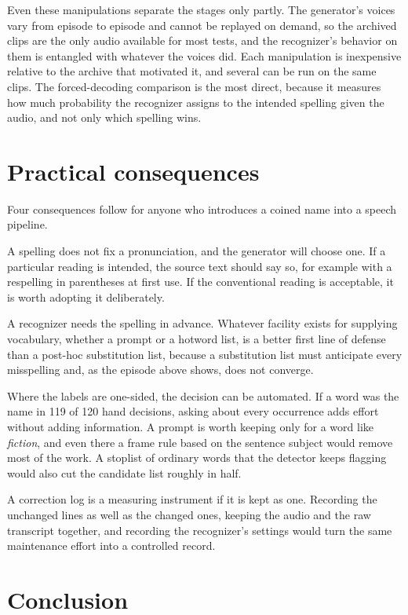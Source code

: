 \documentclass[11pt]{article}
\begin{document}
Even these manipulations separate the stages only partly. The generator's voices vary from episode to episode and cannot be replayed on demand, so the archived clips are the only audio available for most tests, and the recognizer's behavior on them is entangled with whatever the voices did. Each manipulation is inexpensive relative to the archive that motivated it, and several can be run on the same clips. The forced-decoding comparison is the most direct, because it measures how much probability the recognizer assigns to the intended spelling given the audio, and not only which spelling wins.

\section{Practical consequences}

Four consequences follow for anyone who introduces a coined name into a speech pipeline.

A spelling does not fix a pronunciation, and the generator will choose one. If a particular reading is intended, the source text should say so, for example with a respelling in parentheses at first use. If the conventional reading is acceptable, it is worth adopting it deliberately.

A recognizer needs the spelling in advance. Whatever facility exists for supplying vocabulary, whether a prompt or a hotword list, is a better first line of defense than a post-hoc substitution list, because a substitution list must anticipate every misspelling and, as the episode above shows, does not converge.

Where the labels are one-sided, the decision can be automated. If a word was the name in 119 of 120 hand decisions, asking about every occurrence adds effort without adding information. A prompt is worth keeping only for a word like \emph{fiction}, and even there a frame rule based on the sentence subject would remove most of the work. A stoplist of ordinary words that the detector keeps flagging would also cut the candidate list roughly in half.

A correction log is a measuring instrument if it is kept as one. Recording the unchanged lines as well as the changed ones, keeping the audio and the raw transcript together, and recording the recognizer's settings would turn the same maintenance effort into a controlled record.

\section{Conclusion}
\end{document}
